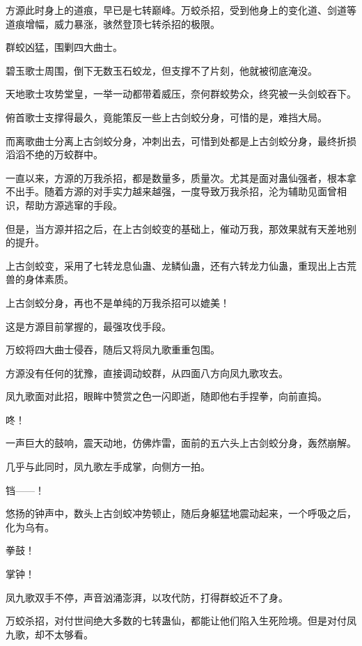
\begin{this_body}

方源此时身上的道痕，早已是七转巅峰。万蛟杀招，受到他身上的变化道、剑道等道痕增幅，威力暴涨，骇然登顶七转杀招的极限。

群蛟凶猛，围剿四大曲士。

碧玉歌士周围，倒下无数玉石蛟龙，但支撑不了片刻，他就被彻底淹没。

天地歌士攻势堂皇，一举一动都带着威压，奈何群蛟势众，终究被一头剑蛟吞下。

俯首歌士支撑得最久，竟能策反一些上古剑蛟分身，可惜的是，难挡大局。

而离歌曲士分离上古剑蛟分身，冲刺出去，可惜到处都是上古剑蛟分身，最终折损滔滔不绝的万蛟群中。

一直以来，方源的万我杀招，都是数量多，质量次。尤其是面对蛊仙强者，根本拿不出手。随着方源的对手实力越来越强，一度导致万我杀招，沦为辅助见面曾相识，帮助方源逃窜的手段。

但是，当方源并招之后，在上古剑蛟变的基础上，催动万我，那效果就有天差地别的提升。

上古剑蛟变，采用了七转龙息仙蛊、龙鳞仙蛊，还有六转龙力仙蛊，重现出上古荒兽的身体素质。

上古剑蛟分身，再也不是单纯的万我杀招可以媲美！

这是方源目前掌握的，最强攻伐手段。

万蛟将四大曲士侵吞，随后又将凤九歌重重包围。

方源没有任何的犹豫，直接调动蛟群，从四面八方向凤九歌攻去。

凤九歌面对此招，眼眸中赞赏之色一闪即逝，随即他右手捏拳，向前直捣。

咚！

一声巨大的鼓响，震天动地，仿佛炸雷，面前的五六头上古剑蛟分身，轰然崩解。

几乎与此同时，凤九歌左手成掌，向侧方一拍。

铛——！

悠扬的钟声中，数头上古剑蛟冲势顿止，随后身躯猛地震动起来，一个呼吸之后，化为乌有。

拳鼓！

掌钟！

凤九歌双手不停，声音汹涌澎湃，以攻代防，打得群蛟近不了身。

万蛟杀招，对付世间绝大多数的七转蛊仙，都能让他们陷入生死险境。但是对付凤九歌，却不太够看。


\end{this_body}
